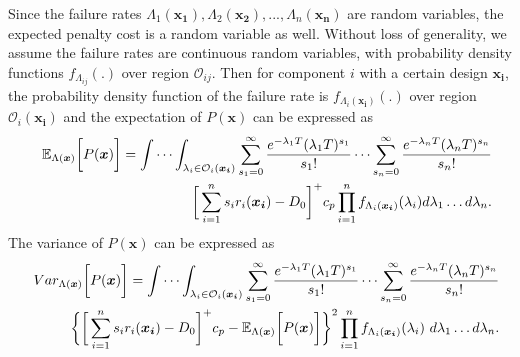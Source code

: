 \documentclass[preprint,12pt]{elsarticle}
\begin{document}
Since the failure rates $\Lambda_{1}(\boldsymbol{x_{1}}),\Lambda_{2}(\boldsymbol{x_{2}}),...,\Lambda_{n}(\boldsymbol{x_{n}})$ are random variables, the expected penalty cost is a random variable as well. Without loss of generality, we assume the failure rates are continuous random variables, with probability density functions $f_{\Lambda_{ij}}(.)$ over region $\mathcal{O}_{ij}$. Then for component $i$ with a certain design $\boldsymbol{x_{i}}$, the probability density function of the failure rate is $f_{\Lambda_{i}(\boldsymbol{x_{i}})}(.)$ over region $\mathcal{O}_{i}(\boldsymbol{x_{i}})$ and the expectation of $P(\boldsymbol{x})$ can be expressed as
\begin{eqnarray}
&& \mathbb{E}_{\Lambda(\boldsymbol{x})} \bigg[P(\boldsymbol{x}) \bigg]=
\idotsint_{\lambda_{i} \in \mathcal{O}_{i}(\boldsymbol{x_i})} \sum_{s_{1}=0}^{\infty}{\frac{e^{-\lambda_{1}T}(\lambda_{1}T)^{s_{1}}}{s_{1}!}}\dots\sum_{s_{n}=0}^{\infty}{\frac{e^{-\lambda_{n}T}(\lambda_{n}T)^{s_{n}}}{s_{n}!}} \nonumber\\
&&\bigg[\sum_{i=1}^{n}{s_{i}r_{i}(\boldsymbol{x_{i}})}-D_{0}\bigg]^{+}c_{p}\prod_{i=1}^{n}{f_{\Lambda_{i}(\boldsymbol{x_{i}})}(\lambda_{i})d\lambda_{1}\dots d\lambda_{n}}. \label{EP2}
\end{eqnarray}
The variance of $P(\boldsymbol{x})$ can be expressed as
\begin{eqnarray}
&&Var_{\Lambda(\boldsymbol{x})} \bigg[ P(\boldsymbol{x}) \bigg]=
\idotsint_{\lambda_{i} \in \mathcal{O}_{i}(\boldsymbol{x_{i}})} \sum_{s_{1}=0}^{\infty}{\frac{e^{-\lambda_{1}T}(\lambda_{1}T)^{s_{1}}}{s_{1}!}}\dots\sum_{s_{n}=0}^{\infty}{\frac{e^{-\lambda_{n}T}(\lambda_{n}T)^{s_{n}}}{s_{n}!}}\nonumber\\
&&\bigg\{\bigg[\sum_{i=1}^{n}{s_{i}r_{i}(\boldsymbol{x_{i}})}-D_{0}\bigg]^{+}c_{p} -\mathbb{E}_{\Lambda(\boldsymbol{x})} \bigg[ P(\boldsymbol{x}) \bigg]\bigg\}^{2} \prod_{i=1}^{n} f_{\Lambda_{i}(\boldsymbol{x_{i}})}(\lambda_{i}) \ d\lambda_{1}\dots d\lambda_{n}.
\end{eqnarray}
\end{document}
